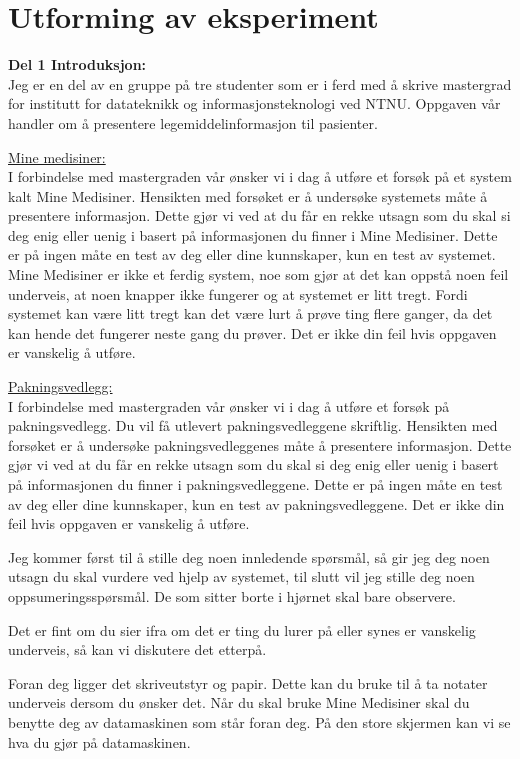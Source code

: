 \chapter{Utforming av eksperiment} \label{chap:utforming}

\textbf{Del 1 Introduksjon:} \\
Jeg er en del av en gruppe på tre studenter som er i ferd med å skrive mastergrad for institutt for datateknikk og informasjonsteknologi ved NTNU. Oppgaven vår handler om å presentere legemiddelinformasjon til pasienter. 


\underline{Mine medisiner:}\\
I forbindelse med mastergraden vår ønsker vi i dag å utføre et forsøk på et system kalt Mine Medisiner. Hensikten med forsøket er å undersøke systemets måte å presentere informasjon. Dette gjør vi ved at du får en rekke utsagn som du skal si deg enig eller uenig i basert på informasjonen du finner i Mine Medisiner. Dette er på ingen måte en test av deg eller dine kunnskaper, kun en test av systemet. Mine Medisiner er ikke et ferdig system, noe som gjør at det kan oppstå noen feil underveis, at noen knapper ikke fungerer og at systemet er litt tregt. Fordi systemet kan være litt tregt kan det være lurt å prøve ting flere ganger, da det kan hende det fungerer neste gang du prøver. Det er ikke din feil hvis oppgaven er vanskelig å utføre. 

\underline{Pakningsvedlegg:}\\
I forbindelse med mastergraden vår ønsker vi i dag å utføre et forsøk på pakningsvedlegg. Du vil få utlevert pakningsvedleggene skriftlig. Hensikten med forsøket er å undersøke pakningsvedleggenes måte å presentere informasjon. Dette gjør vi ved at du får en rekke utsagn som du skal si deg enig eller uenig i basert på informasjonen du finner i pakningsvedleggene. Dette er på ingen måte en test av deg eller dine kunnskaper, kun en test av pakningsvedleggene. Det er ikke din feil hvis oppgaven er vanskelig å utføre. 

Jeg kommer først til å stille deg noen innledende spørsmål, så gir jeg deg noen utsagn du skal vurdere ved hjelp av systemet, til slutt vil jeg stille deg noen oppsumeringsspørsmål. De som sitter borte i hjørnet skal bare observere.

Det er fint om du sier ifra om det er ting du lurer på eller synes er vanskelig underveis, så kan vi diskutere det etterpå. 

Foran deg ligger det skriveutstyr og papir. Dette kan du bruke til å ta notater underveis dersom du ønsker det. Når du skal bruke Mine Medisiner skal du benytte deg av datamaskinen som står foran deg. På den store skjermen kan vi se hva du gjør på datamaskinen. 

